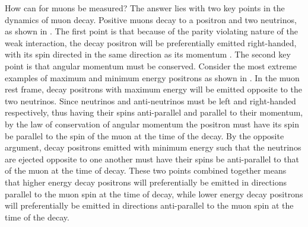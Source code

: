 How can \wa for muons be measured? The answer lies with two key points in the dynamics of muon decay. Positive muons decay to a positron and two neutrinos, as shown in . The first point is that because of the parity violating nature of the weak interaction, the decay positron will be preferentially emitted right-handed, with its spin directed in the same direction as its momentum \cite{Bucksbaum}. The second key point is that angular momentum must be conserved. Consider the most extreme examples of maximum and minimum energy positrons as shown in . In the muon rest frame, decay positrons with maximum energy will be emitted opposite to the two neutrinos. Since neutrinos and anti-neutrinos must be left and right-handed respectively, thus having their spins anti-parallel and parallel to their momentum, by the law of conservation of angular momentum the positron must have its spin be parallel to the spin of the muon at the time of the decay. By the opposite argument, decay positrons emitted with minimum energy such that the neutrinos are ejected opposite to one another must have their spins be anti-parallel to that of the muon at the time of decay. These two points combined together means that higher energy decay positrons will preferentially be emitted in directions parallel to the muon spin at the time of decay, while lower energy decay positrons will preferentially be emitted in directions anti-parallel to the muon spin at the time of the decay. 

